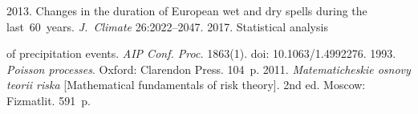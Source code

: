   \begin{multicols}{2}

\renewcommand{\bibname}{\protect\rmfamily References}

{\small\frenchspacing
 {%
 \begin{thebibliography}{99}

2013. Changes in the duration of European wet and dry spells during the last~60~years. 
\textit{J.~Climate} 26:2022--2047.
 2017. 
Statistical  analysis\linebreak\vspace*{-12pt}

\columnbreak

\noindent
 of precipitation events. 
\textit{AIP Conf. Proc.} 1863(1). doi: 10.1063/1.4992276.
 1993. \textit{Poisson processes}. Oxford: Clarendon Press. 104~p.
2011. \textit{Matematicheskie osnovy teorii riska}
[Mathematical fundamentals of risk theory]. 2nd ed. Moscow: Fizmatlit. 591~p.
{

}

\pagebreak


\end{thebibliography}}}
\end{multicols}
